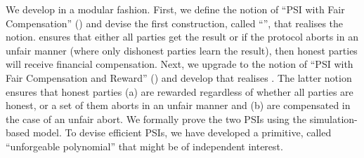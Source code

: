 








We develop \withRew in a modular fashion. First, we define the notion of ``PSI with Fair Compensation'' (\p) and devise the first construction, called ``\withFai'', that realises the notion. \p ensures that either all parties get the result or if the protocol aborts in an unfair manner (where only dishonest parties learn the result), then honest parties will receive financial compensation. Next, we upgrade \p to the notion of ``PSI with Fair Compensation and Reward'' (\ep) and develop \withRew that realises \ep. The latter notion ensures that honest parties (a) are rewarded regardless of whether all parties are honest, or a set of them aborts in an unfair manner and (b) are compensated in the case of an unfair abort. We formally prove the two PSIs using the simulation-based model. To devise efficient PSIs, we have developed a primitive, called ``unforgeable polynomial'' that might be of independent interest. 

